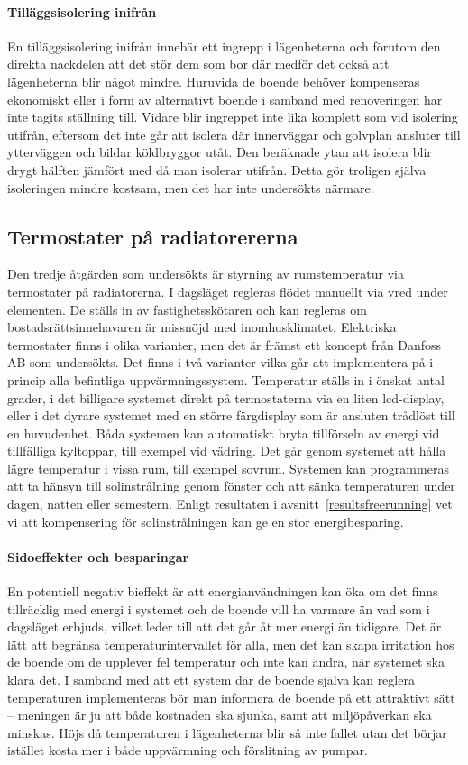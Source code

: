 \paragraph{Tilläggsisolering inifrån}
En tilläggsisolering inifrån innebär ett ingrepp i lägenheterna och förutom den direkta nackdelen att det stör dem som bor där medför det också att lägenheterna blir något mindre. Huruvida de boende behöver kompenseras ekonomiskt eller i form av alternativt boende i samband med renoveringen har inte tagits ställning till. Vidare blir ingreppet inte lika komplett som vid isolering utifrån, eftersom det inte går att isolera där innerväggar och golvplan ansluter till ytterväggen och bildar köldbryggor utåt. Den beräknade ytan att isolera blir drygt hälften jämfört med då man isolerar utifrån. Detta gör troligen själva isoleringen mindre kostsam, men det har inte undersökts närmare.

\subsection{Termostater på radiatorererna}
Den tredje åtgärden som undersökts är styrning av rumstemperatur via termostater på radiatorerna. I dagsläget regleras flödet manuellt via vred under elementen. De ställs in av fastighetsskötaren och kan regleras om bostadsrättsinnehavaren är missnöjd med inomhusklimatet. Elektriska termostater finns i olika varianter, men det är främst ett koncept från Danfoss AB som undersökts. Det finns i två varianter vilka går att implementera på i princip alla befintliga uppvärmningssystem. Temperatur ställs in i önskat antal grader, i det billigare systemet direkt på termostaterna via en liten lcd-display, eller i det dyrare systemet med en större färgdisplay som är ansluten trådlöst till en huvudenhet. Båda systemen kan automatiskt bryta tillförseln av energi vid tillfälliga kyltoppar, till exempel vid vädring. Det går genom systemet att hålla lägre temperatur i vissa rum, till exempel sovrum. Systemen kan programmeras att ta hänsyn till solinstrålning genom fönster och att sänka temperaturen under dagen, natten eller semestern. Enligt resultaten i avsnitt~\ref{resultsfreerunning} vet vi att kompensering för solinstrålningen kan ge en stor energibesparing.

\paragraph{Sidoeffekter och besparingar}
En potentiell negativ bieffekt är att energianvändningen kan öka om det finns tillräcklig med energi i systemet och de boende vill ha varmare än vad som i dagsläget erbjuds, vilket leder till att det går åt mer energi än tidigare. Det är lätt att begränsa temperaturintervallet för alla, men det kan skapa irritation hos de boende om de upplever fel temperatur och inte kan ändra, när systemet ska klara det. I samband med att ett system där de boende själva kan reglera temperaturen implementeras bör man informera de boende på ett attraktivt sätt – meningen är ju att både kostnaden ska sjunka, samt att miljöpåverkan ska minskas. Höjs då temperaturen i lägenheterna blir så inte fallet utan det börjar istället kosta mer i både uppvärmning och förslitning av pumpar. \cite{viivilla}

